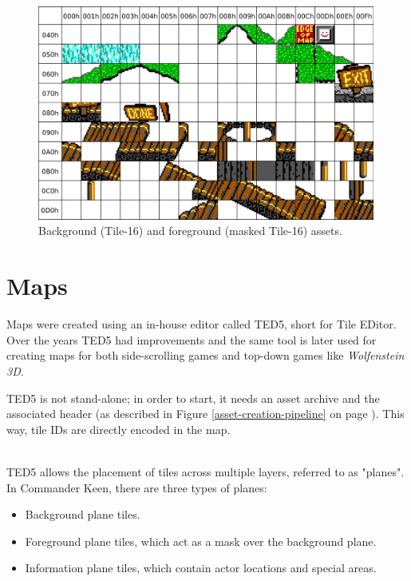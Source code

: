 \documentclass[book.tex]{subfiles}
\begin{document}
\begin{figure}[H] 
  \centering 
  \includegraphics[width=0.99\textwidth, frame]{screenshots_300dpi/tile16M_assets.png}
  \caption{Background (Tile-16) and foreground (masked Tile-16) assets.}
  \label{fig:tile16_assets}
\end{figure} 



\section{Maps}
Maps were created using an in-house editor called TED5, short for Tile EDitor. Over the years TED5 had improvements and the same tool is later used for creating maps for both side-scrolling games and top-down games like \textit{Wolfenstein 3D}.\\
\par
 TED5 is not stand-alone; in order to start, it needs an asset archive and the  associated header (as described in Figure \ref{asset-creation-pipeline} on page \pageref{asset-creation-pipeline}). This way, tile IDs are directly encoded in the map.\\

\vspace{-3pt}
\\
 
 \par
TED5 allows the placement of tiles across multiple layers, referred to as "planes". In Commander Keen, there are three types of planes: 
\begin{itemize}
  \item Background plane tiles.
  \item Foreground plane tiles, which act as a mask over the background plane.
  \item Information plane tiles, which contain actor locations and special areas.
\end{itemize}
\end{document}
